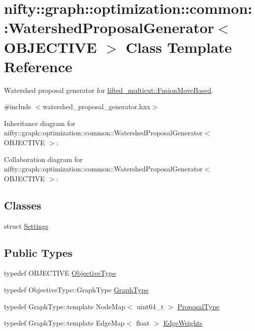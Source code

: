 \hypertarget{classnifty_1_1graph_1_1optimization_1_1common_1_1WatershedProposalGenerator}{}\section{nifty\+:\+:graph\+:\+:optimization\+:\+:common\+:\+:Watershed\+Proposal\+Generator$<$ O\+B\+J\+E\+C\+T\+I\+V\+E $>$ Class Template Reference}
\label{classnifty_1_1graph_1_1optimization_1_1common_1_1WatershedProposalGenerator}


Watershed proposal generator for \hyperlink{classnifty_1_1graph_1_1lifted__multicut_1_1FusionMoveBased}{lifted\+\_\+multicut\+::\+Fusion\+Move\+Based}.  




{\ttfamily \#include $<$watershed\+\_\+proposal\+\_\+generator.\+hxx$>$}



Inheritance diagram for nifty\+:\+:graph\+:\+:optimization\+:\+:common\+:\+:Watershed\+Proposal\+Generator$<$ O\+B\+J\+E\+C\+T\+I\+V\+E $>$\+:


Collaboration diagram for nifty\+:\+:graph\+:\+:optimization\+:\+:common\+:\+:Watershed\+Proposal\+Generator$<$ O\+B\+J\+E\+C\+T\+I\+V\+E $>$\+:
\subsection*{Classes}
\begin{DoxyCompactItemize}
\item 
struct \hyperlink{structnifty_1_1graph_1_1optimization_1_1common_1_1WatershedProposalGenerator_1_1Settings}{Settings}
\end{DoxyCompactItemize}
\subsection*{Public Types}
\begin{DoxyCompactItemize}
\item 
typedef O\+B\+J\+E\+C\+T\+I\+V\+E \hyperlink{classnifty_1_1graph_1_1optimization_1_1common_1_1WatershedProposalGenerator_a2de6e9c22ef125106cb152bcc78a9499}{Objective\+Type}
\item 
typedef Objective\+Type\+::\+Graph\+Type \hyperlink{classnifty_1_1graph_1_1optimization_1_1common_1_1WatershedProposalGenerator_af611ecb32c5b35254c3819c30c3e45dd}{Graph\+Type}
\item 
typedef Graph\+Type\+::template Node\+Map$<$ uint64\+\_\+t $>$ \hyperlink{classnifty_1_1graph_1_1optimization_1_1common_1_1WatershedProposalGenerator_a8cc703b2708f27f2a7820b985ebfdd11}{Proposal\+Type}
\item 
typedef Graph\+Type\+::template Edge\+Map$<$ float $>$ \hyperlink{classnifty_1_1graph_1_1optimization_1_1common_1_1WatershedProposalGenerator_a58c25ae97936dbf58091b2ffef541b33}{Edge\+Weights}
\end{DoxyCompactItemize}
